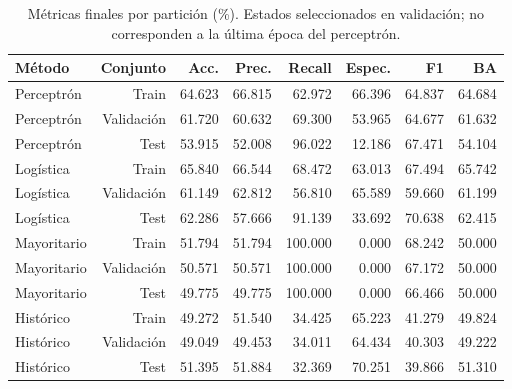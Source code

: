 \begin{table}[htbp]
\centering\small
\caption{Métricas finales por partición (\%). Estados seleccionados en validación; no corresponden a la última época del perceptrón.}\label{tab:metricas}
\begin{tabular}{lrrrrrrr}\toprule
Método & Conjunto & Acc. & Prec. & Recall & Espec. & F1 & BA \\ \midrule
Perceptrón & Train & 64.623 & 66.815 & 62.972 & 66.396 & 64.837 & 64.684 \\
Perceptrón & Validación & 61.720 & 60.632 & 69.300 & 53.965 & 64.677 & 61.632 \\
Perceptrón & Test & 53.915 & 52.008 & 96.022 & 12.186 & 67.471 & 54.104 \\
Logística & Train & 65.840 & 66.544 & 68.472 & 63.013 & 67.494 & 65.742 \\
Logística & Validación & 61.149 & 62.812 & 56.810 & 65.589 & 59.660 & 61.199 \\
Logística & Test & 62.286 & 57.666 & 91.139 & 33.692 & 70.638 & 62.415 \\
Mayoritario & Train & 51.794 & 51.794 & 100.000 & 0.000 & 68.242 & 50.000 \\
Mayoritario & Validación & 50.571 & 50.571 & 100.000 & 0.000 & 67.172 & 50.000 \\
Mayoritario & Test & 49.775 & 49.775 & 100.000 & 0.000 & 66.466 & 50.000 \\
Histórico & Train & 49.272 & 51.540 & 34.425 & 65.223 & 41.279 & 49.824 \\
Histórico & Validación & 49.049 & 49.453 & 34.011 & 64.434 & 40.303 & 49.222 \\
Histórico & Test & 51.395 & 51.884 & 32.369 & 70.251 & 39.866 & 51.310 \\
\bottomrule\end{tabular}
\end{table}
